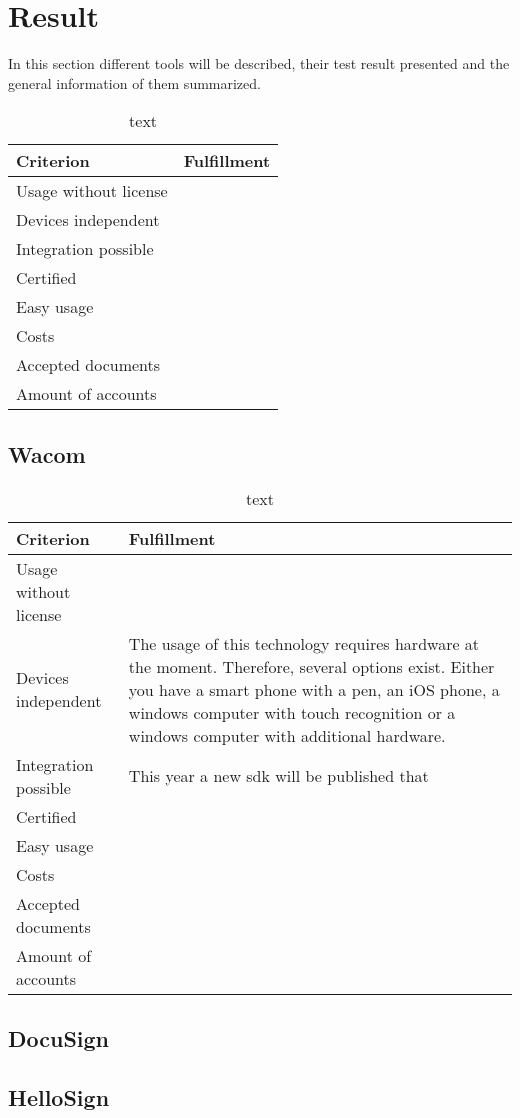 \section{Result}
In this section different tools will be described, their test result presented and the general information of them summarized.

\begin{table}[h]
	\begin{tabular}{|p{4cm}|p{10cm}|} \hline
		Criterion & Fulfillment \\ \hline
		Usage without license & \\ \hline
		Devices independent & \\ \hline
		Integration possible & \\ \hline
		Certified & \\ \hline
		Easy usage & \\ \hline
		Costs & \\ \hline
		Accepted documents & \\ \hline
		Amount of accounts & \\ \hline
	\end{tabular}
	\caption{text}
	\label{key}
\end{table}

\subsection{Wacom}

\begin{table}[h]
	\begin{tabular}{|p{4cm}|p{10cm}|} \hline
		Criterion & Fulfillment \\ \hline
		Usage without license & \\ \hline
		Devices independent & The usage of this technology requires hardware at the moment. Therefore, several options exist. Either you have a smart phone with a pen, an iOS phone, a windows computer with touch recognition or a windows computer with additional hardware.\\ \hline
		Integration possible & This year a new \gls{sdk} will be published that \\ \hline
		Certified & \\ \hline
		Easy usage & \\ \hline
		Costs & \\ \hline
		Accepted documents & \\ \hline
		Amount of accounts & \\ \hline
	\end{tabular}
	\caption{text}
	\label{key}
\end{table}

\subsection{DocuSign}

\subsection{HelloSign}

